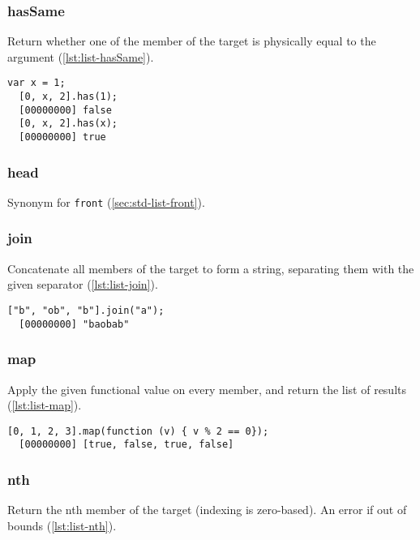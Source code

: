 \subsubsection{hasSame}

Return whether one of the member of the target is physically equal to
the argument (\autoref{lst:list-hasSame}).

\begin{lstlisting}[caption=List.hasSame, label=lst:list-hasSame, float=\floatposh]
  var x = 1;
  [0, x, 2].has(1);
  [00000000] false
  [0, x, 2].has(x);
  [00000000] true
\end{lstlisting}

\subsubsection{head}

Synonym for \lstinline|front| (\autoref{sec:std-list-front}).

\subsubsection{join}

Concatenate all members of the target to form a string, separating
them with the given separator (\autoref{lst:list-join}).

\begin{lstlisting}[caption=List.join, label=lst:list-join, float=\floatposh]
  ["b", "ob", "b"].join("a");
  [00000000] "baobab"
\end{lstlisting}

\subsubsection{map}

Apply the given functional value on every member, and return the list
of results (\autoref{lst:list-map}).

\begin{lstlisting}[caption=List.map, label=lst:list-map, float=\floatposh]
  [0, 1, 2, 3].map(function (v) { v % 2 == 0});
  [00000000] [true, false, true, false]
\end{lstlisting}

\subsubsection{nth}
\label{sec:std-list-nth}

Return the nth member of the target (indexing is zero-based). An error
if out of bounds (\autoref{lst:list-nth}).

